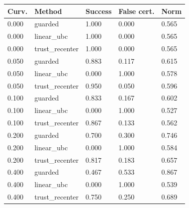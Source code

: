 \begin{tabular}{lllll}
\toprule
Curv. & Method & Success & False cert. & Norm \\
\midrule
0.000 & guarded & 1.000 & 0.000 & 0.565 \\
0.000 & linear\_ubc & 1.000 & 0.000 & 0.565 \\
0.000 & trust\_recenter & 1.000 & 0.000 & 0.565 \\
0.050 & guarded & 0.883 & 0.117 & 0.615 \\
0.050 & linear\_ubc & 0.000 & 1.000 & 0.578 \\
0.050 & trust\_recenter & 0.950 & 0.050 & 0.596 \\
0.100 & guarded & 0.833 & 0.167 & 0.602 \\
0.100 & linear\_ubc & 0.000 & 1.000 & 0.527 \\
0.100 & trust\_recenter & 0.867 & 0.133 & 0.562 \\
0.200 & guarded & 0.700 & 0.300 & 0.746 \\
0.200 & linear\_ubc & 0.000 & 1.000 & 0.584 \\
0.200 & trust\_recenter & 0.817 & 0.183 & 0.657 \\
0.400 & guarded & 0.467 & 0.533 & 0.867 \\
0.400 & linear\_ubc & 0.000 & 1.000 & 0.539 \\
0.400 & trust\_recenter & 0.750 & 0.250 & 0.689 \\
\bottomrule
\end{tabular}
